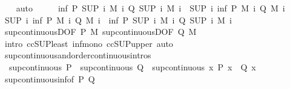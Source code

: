 \begin{isabellebody}
\ \ \isamarkupfalse%
\ auto\isanewline
\ \ \isamarkupfalse%
\ \isamarkupfalse%
\ {\isachardoublequoteopen}inf\ {\isacharparenleft}P\ {\isacharparenleft}SUP\ i{\isachardot}\ M\ i{\isacharparenright}{\isacharparenright}\ {\isacharparenleft}Q\ {\isacharparenleft}SUP\ i{\isachardot}\ M\ i{\isacharparenright}{\isacharparenright}\ {\isasymle}\ {\isacharparenleft}SUP\ i{\isachardot}\ inf\ {\isacharparenleft}P\ {\isacharparenleft}M\ i{\isacharparenright}{\isacharparenright}\ {\isacharparenleft}Q\ {\isacharparenleft}M\ i{\isacharparenright}{\isacharparenright}{\isacharparenright}{\isachardoublequoteclose}\ \isacommand{{\isachardot}}\isamarkupfalse%
\isanewline
\isanewline
\ \ \isamarkupfalse%
\ {\isachardoublequoteopen}{\isacharparenleft}SUP\ i{\isachardot}\ inf\ {\isacharparenleft}P\ {\isacharparenleft}M\ i{\isacharparenright}{\isacharparenright}\ {\isacharparenleft}Q\ {\isacharparenleft}M\ i{\isacharparenright}{\isacharparenright}{\isacharparenright}\ {\isasymle}\ inf\ {\isacharparenleft}P\ {\isacharparenleft}SUP\ i{\isachardot}\ M\ i{\isacharparenright}{\isacharparenright}\ {\isacharparenleft}Q\ {\isacharparenleft}SUP\ i{\isachardot}\ M\ i{\isacharparenright}{\isacharparenright}{\isachardoublequoteclose}\isanewline
\ \ \ \ \isamarkupfalse%
\ sup{\isacharunderscore}continuousD{\isacharbrackleft}OF\ P\ M{\isacharbrackright}\ sup{\isacharunderscore}continuousD{\isacharbrackleft}OF\ Q\ M{\isacharbrackright}\ \isamarkupfalse%
\ {\isacharparenleft}intro\ ccSUP{\isacharunderscore}least\ inf{\isacharunderscore}mono\ ccSUP{\isacharunderscore}upper{\isacharparenright}\ auto\isanewline
{}\isamarkupfalse%
%
\endisatagproof
{\isafoldproof}%
%
\isadelimproof
\isanewline
%
\endisadelimproof
\isanewline
{}\isamarkupfalse%
\ sup{\isacharunderscore}continuous{\isacharunderscore}and{\isacharbrackleft}order{\isacharunderscore}continuous{\isacharunderscore}intros{\isacharbrackright}{\isacharcolon}\isanewline
\ \ {\isachardoublequoteopen}sup{\isacharunderscore}continuous\ P\ {\isasymLongrightarrow}\ sup{\isacharunderscore}continuous\ Q\ {\isasymLongrightarrow}\ sup{\isacharunderscore}continuous\ {\isacharparenleft}{\isasymlambda}x{\isachardot}\ P\ x\ {\isasymand}\ Q\ x{\isacharparenright}{\isachardoublequoteclose}\isanewline
%
\isadelimproof
\ \ %
\endisadelimproof
%
\isatagproof
{}\isamarkupfalse%
\ sup{\isacharunderscore}continuous{\isacharunderscore}inf{\isacharbrackleft}of\ P\ Q{\isacharbrackright}\ \isamarkupfalse%

\end{isabellebody}
